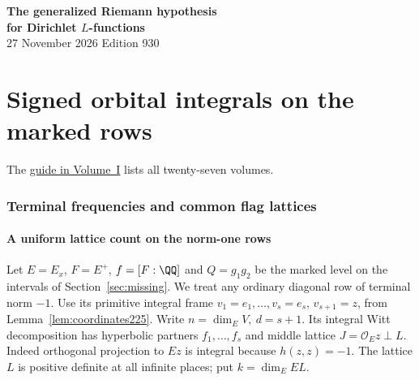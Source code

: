 \documentclass[a4paper,11pt]{article}
\theoremstyle{definition}
\theoremstyle{remark}
\numberwithin{equation}{section}
\begin{document}
\setcounter{part}{21}
\thispagestyle{plain}\begin{center}
{\LARGE\bfseries The generalized Riemann hypothesis\\[2pt]for Dirichlet \(L\)-functions}\\[6pt]
{\small 27 November 2026 \quad\textperiodcentered\quad Edition 930}\end{center}
\part{Signed orbital integrals on the marked rows}\label{part:XXII}
\begin{abstract}\noindent The common flag lattice controls denominators at the two terminal frequencies. We truncate the Gram determinant sum by height, compute the local integrals of its transverse lifts and distinguish rational classes in the signed period.\end{abstract}
\setcounter{section}{114}
\noindent The \hyperref[seriesguide]{guide in Volume~I} lists all twenty-seven volumes.
\begingroup\small\setlength{\parskip}{0pt}\tableofcontents\endgroup
\clearpage

\section{Terminal frequencies and common flag lattices}\label{nav:chapter-ordinary-terminal-lattices}\label{nav:volume-XXII}

\subsection{A uniform lattice count on the norm-one rows}
\label{sec:unipotentpacking552}

Let \(E=E_x\), \(F=E^+\), \(f=[F:\QQ]\) and \(Q=g_1g_2\) be
the marked level on the intervals of Section~\ref{sec:missing}.
We treat any ordinary diagonal row of terminal norm \(-1\).
Use its primitive integral frame \(v_1=e_1,\ldots,v_s=e_s\),
\(v_{s+1}=z\), from Lemma~\ref{lem:coordinates225}.
Write \(n=\dim_E V,\ d=s+1\). Its integral Witt decomposition
has hyperbolic partners \(f_1,\ldots,f_s\) and middle lattice
\(J=\mathcal O_E z\perp L\). Indeed orthogonal projection to
\(E z\) is integral because \(h(z,z)=-1\). The lattice \(L\)
is positive definite at all infinite places; put \(k=\dim_E EL\).
\end{document}
